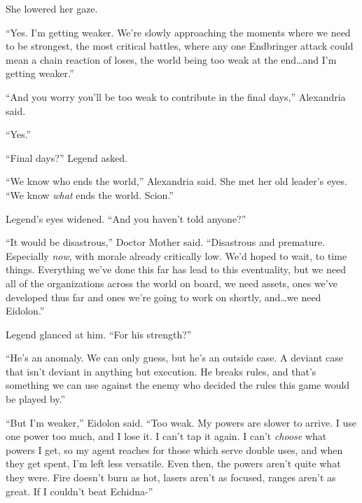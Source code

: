 She lowered her gaze.



``Yes.  I'm getting weaker.  We're slowly approaching the moments where we need to be strongest, the most critical battles, where any one Endbringer attack could mean a chain reaction of loses, the world being too weak at the end\ldots and I'm getting weaker.''



``And you worry you'll be too weak to contribute in the final days,'' Alexandria said.



``Yes.''



``Final days?'' Legend asked.



``We know who ends the world,'' Alexandria said.  She met her old leader's eyes.  ``We know \emph{what} ends the world.  Scion.''



Legend's eyes widened.  ``And you haven't told anyone?''



``It would be disastrous,'' Doctor Mother said.  ``Disastrous and premature.  Especially \emph{now}, with morale already critically low.  We'd hoped to wait, to time things.  Everything we've done this far has lead to this eventuality, but we need all of the organizations across the world on board, we need assets, ones we've developed thus far and ones we're going to work on shortly, and\ldots we need Eidolon.''



Legend glanced at him.  ``For his strength?''



``He's an anomaly.  We can only guess, but he's an outside case.  A deviant case that isn't deviant in anything but execution.  He breaks rules, and that's something we can use against the enemy who decided the rules this game would be played by.''



``But I'm weaker,'' Eidolon said.  ``Too weak. My powers are slower to arrive.  I use one power too much, and I lose it.  I can't tap it again.  I can't \emph{choose} what powers I get, so my agent reaches for those which serve double uses, and when they get spent, I'm left less versatile.  Even then, the powers aren't quite what they were.  Fire doesn't burn as hot, lasers aren't as focused, ranges aren't as great.  If I couldn't beat Echidna-''



